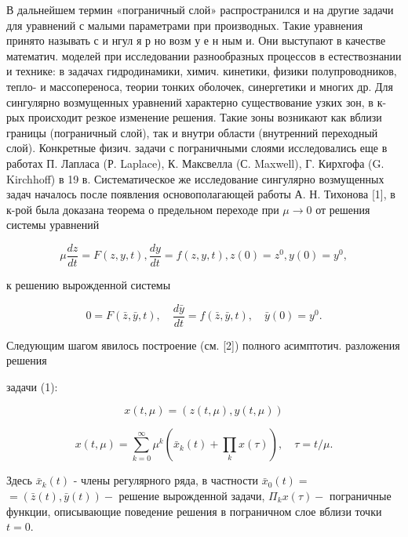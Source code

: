 \documentclass[10pt]{article}
\begin{document}
В дальнейшем термин «пограничный слой» распространился и на другие задачи для уравнений с малыми параметрами при производных. Такие уравнения принято называть с и нгул я р но возм у е н ным и. Они выступают в качестве математич. моделей при исследовании разнообразных процессов в естествознании и технике: в задачах гидродинамики, химич. кинетики, физики полупроводников, тепло- и массопереноса, теории тонких оболочек, синергетики и многих др. Для сингулярно возмущенных уравнений характерно существование узких зон, в к-рых происходит резкое изменение решения. Такие зоны возникают как вблизи границы (пограничный слой), так и внутри области (внутренний переходный слой). Конкретные физич. задачи с пограничными слоями исследовались еще в работах П. Лапласа (Р. Laplace), К. Максвелла (С. Maxwell), Г. Кирхгофа (G. Kirchhoff) в 19 в. Систематическое же исследование сингулярно возмущенных задач началось после появления основополагающей работы А. Н. Тихонова [1], в к-рой была доказана теорема о предельном переходе при $\mu \rightarrow 0$ от решения системы уравнений



\[

\mu \frac{d z}{d t}=F(z, y, t), \frac{d y}{d t}=f(z, y, t), z(0)=z^{0}, y(0)=y^{0},

\]



к решению вырожденной системы



\[

0=F(\bar{z}, \bar{y}, t), \quad \frac{d \bar{y}}{d t}=f(\bar{z}, \bar{y}, t), \quad \bar{y}(0)=y^{0} .

\]



Следующим шагом явилось построение (см. [2]) полного асимптотич. разложения решения



задачи (1):



\[

x(t, \mu)=(z(t, \mu), y(t, \mu))

\]



\[

x(t, \mu)=\sum_{k=0}^{\infty} \mu^{k}\left(\bar{x}_{k}(t)+\prod_{k} x(\tau)\right), \quad \tau=t / \mu .

\]



Здесь $\bar{x}_{k}(t)$ - члены регулярного ряда, в частности $\bar{x}_{0}(t)=$ $=(\bar{z}(t), \bar{y}(t))-$ решение вырожденной задачи, $\Pi_{k} x(\tau)-$ пограничные функции, описывающие поведение решения в пограничном слое вблизи точки $t=0$.
\end{document}
